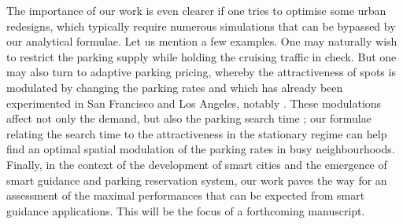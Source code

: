 \documentclass[trsc,reprint]{informs3}
\begin{document}
The importance of our work is even clearer if one tries to optimise some urban redesigns, which typically require numerous simulations that can be bypassed by our analytical formulae. Let us mention a few examples. One may naturally wish to restrict the parking supply while holding the cruising traffic in check. But one may also turn to adaptive parking pricing, whereby the attractiveness of spots is modulated by changing the parking rates and which has already been experimented in San Francisco and Los Angeles, notably \citep{shoup2018parking}. These modulations affect not only the demand, but also the parking search time \citep{dutta2021searching}; our formulae relating the search time to the attractiveness in the stationary regime can help find an optimal spatial modulation of the parking rates in busy neighbourhoods.
Finally, in the context of the development of smart cities and the emergence of smart guidance and parking reservation system, our work paves the way for an assessment of the maximal performances that can be expected from smart guidance applications. This will be the focus of a forthcoming manuscript.


\end{document}
